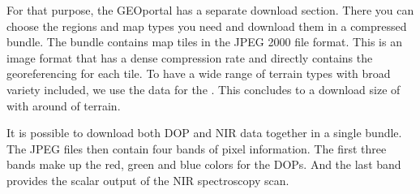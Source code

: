 For that purpose, the GEOportal has a separate download section. There you can choose the regions and map types you need and download them in a compressed bundle. The bundle contains map tiles in the JPEG 2000 file format. This is an image format that has a dense compression rate and directly contains the georeferencing for each tile. To have a wide range of terrain types with broad variety included, we use the data for the . This concludes to a download size of  with around  of terrain.

It is possible to download both DOP and NIR data together in a single bundle. The JPEG files then contain four bands of pixel information. The first three bands make up the red, green and blue colors for the DOPs. And the last band provides the scalar output of the NIR spectroscopy scan.



